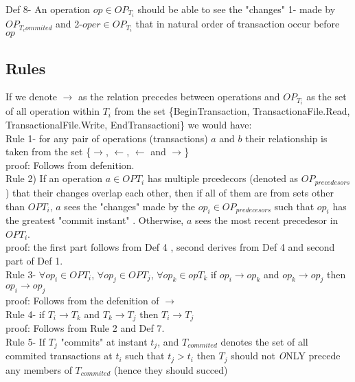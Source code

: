 \documentclass[a4paper, 11pt]{article}
\begin{document}
Def 8- An operation $op \in OP_{T_i}$ should be able to see the "changes" 1- made by $OP_{T_commited}$ and 2-$oper \in OP_{T_i}$ that in natural order of transaction occur before $op$

\subsection{Rules}
If we denote $\rightarrow$ as the relation precedes between operations and $OP_{T_i}$ as the set of all operation within $T_i$ from the set \{BeginTransaction, TransactionaFile.Read, TransactionalFile.Write, EndTransactioni\} we would have: \\ 

Rule 1- for any pair of operations (transactions) $a$ and $b$ their relationship is taken from the set \{$\rightarrow$, $\leftarrow$, $\leftarrow$ and $\rightarrow$\} \\

proof: Follows from defenition. \\

Rule 2) If an operation $a \in OP{T_i}$ has multiple prcedecors (denoted as $OP_{precedesors}$) that their changes overlap each other, then if all of them are from sets other than $OP{T_i}$, $a$ sees the "changes" made by the $op_i \in OP_{predecesors}$ such that $op_i$ has the greatest "commit instant"  . Otherwise, $a$ sees the most recent precedesor in $OP{T_i}$. \\  

proof: the first part follows from Def 4 , second derives from Def 4 and second part of Def 1.\\

Rule 3- $\forall op_i \in  OP{T_i}$, $\forall op_j \in  OP{T_j}$, $\forall op_k \in  op{T_k}$ if $op_i \rightarrow op_k$ and $op_k \rightarrow op_j$ then $op_i \rightarrow op_j$ \\

proof: Follows from the defenition of $\rightarrow$ \\


Rule 4- if $T_i \rightarrow T_k$ and $T_k \rightarrow T_j$ then $T_i \rightarrow T_j$ \\

proof: Follows from Rule 2 and Def 7. \\ 


Rule 5- If $T_j$ "commits" at instant $t_j$, and $T_{commited}$ denotes the set of all commited transactions at $t_i$ such that $t_j > t_i$ then $T_j$ should not \emph ONLY precede any members of $T_{commited}$ (hence they should succed)\\
\end{document}
